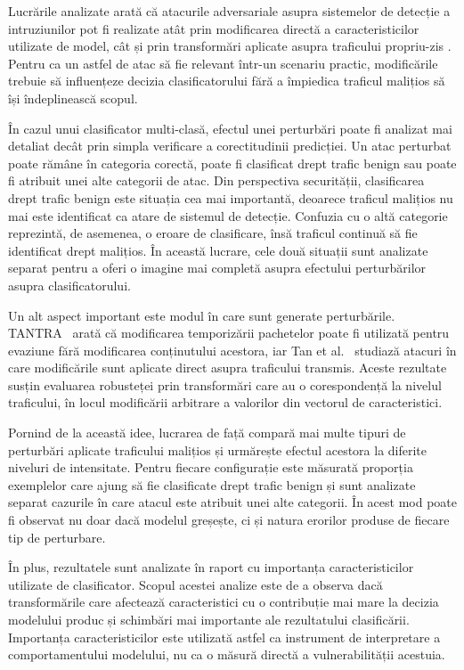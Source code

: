 Lucrările analizate arată că atacurile adversariale asupra sistemelor de detecție a intruziunilor pot fi realizate atât prin modificarea directă a caracteristicilor utilizate de model, cât și prin transformări aplicate asupra traficului propriu-zis \cite{he2023adversarial, alotaibi2023adversarial}. Pentru ca un astfel de atac să fie relevant într-un scenariu practic, modificările trebuie să influențeze decizia clasificatorului fără a împiedica traficul malițios să își îndeplinească scopul.

În cazul unui clasificator multi-clasă, efectul unei perturbări poate fi analizat mai detaliat decât prin simpla verificare a corectitudinii predicției. Un atac perturbat poate rămâne în categoria corectă, poate fi clasificat drept trafic benign sau poate fi atribuit unei alte categorii de atac. Din perspectiva securității, clasificarea drept trafic benign este situația cea mai importantă, deoarece traficul malițios nu mai este identificat ca atare de sistemul de detecție. Confuzia cu o altă categorie reprezintă, de asemenea, o eroare de clasificare, însă traficul continuă să fie identificat drept malițios. În această lucrare, cele două situații sunt analizate separat pentru a oferi o imagine mai completă asupra efectului perturbărilor asupra clasificatorului.

Un alt aspect important este modul în care sunt generate perturbările. TANTRA~\cite{sharon2022tantra} arată că modificarea temporizării pachetelor poate fi utilizată pentru evaziune fără modificarea conținutului acestora, iar Tan et al.~\cite{tan2022sneaking} studiază atacuri în care modificările sunt aplicate direct asupra traficului transmis. Aceste rezultate susțin evaluarea robusteței prin transformări care au o corespondență la nivelul traficului, în locul modificării arbitrare a valorilor din vectorul de caracteristici.

Pornind de la această idee, lucrarea de față compară mai multe tipuri de perturbări aplicate traficului malițios și urmărește efectul acestora la diferite niveluri de intensitate. Pentru fiecare configurație este măsurată proporția exemplelor care ajung să fie clasificate drept trafic benign și sunt analizate separat cazurile în care atacul este atribuit unei alte categorii. În acest mod poate fi observat nu doar dacă modelul greșește, ci și natura erorilor produse de fiecare tip de perturbare.

În plus, rezultatele sunt analizate în raport cu importanța caracteristicilor utilizate de clasificator. Scopul acestei analize este de a observa dacă transformările care afectează caracteristici cu o contribuție mai mare la decizia modelului produc și schimbări mai importante ale rezultatului clasificării. Importanța caracteristicilor este utilizată astfel ca instrument de interpretare a comportamentului modelului, nu ca o măsură directă a vulnerabilității acestuia.

